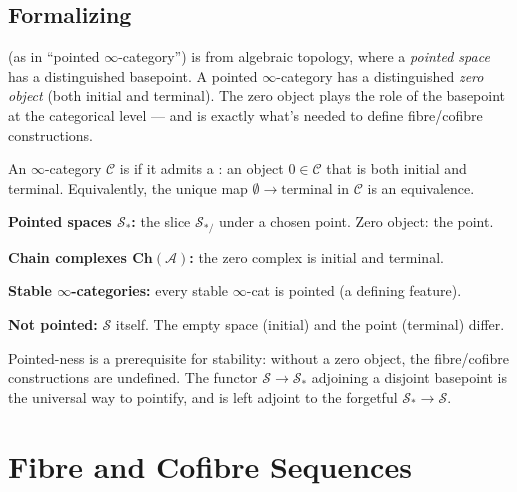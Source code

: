 \subsection{Formalizing}

\begin{nameorigin}
 (as in ``pointed $\infty$-category'') is from algebraic
topology, where a \emph{pointed space} has a distinguished basepoint.
A pointed $\infty$-category has a distinguished \emph{zero object}
(both initial and terminal). The zero object plays the role of the
basepoint at the categorical level — and is exactly what's needed to
define fibre/cofibre constructions.
\end{nameorigin}

\begin{definition}
\label{def:pointed-qcat}
An $\infty$-category $\mathcal{C}$ is  if it admits a
: an object $0 \in \mathcal{C}$ that is both initial
and terminal. Equivalently, the unique map $\emptyset \to \mathrm{terminal}$
in $\mathcal{C}$ is an equivalence.
\end{definition}

\begin{example_thm}
\label{ex:pointed-examples}
\textbf{Pointed spaces $\mathcal{S}_*$:} the slice $\mathcal{S}_{*/}$
under a chosen point. Zero object: the point.

\textbf{Chain complexes $\mathbf{Ch}(\mathcal{A})$:} the zero complex
is initial and terminal.

\textbf{Stable $\infty$-categories:} every stable $\infty$-cat is
pointed (a defining feature).

\textbf{Not pointed:} $\mathcal{S}$ itself. The empty space (initial)
and the point (terminal) differ.
\end{example_thm}

\begin{remark}
Pointed-ness is a prerequisite for stability: without a zero object, the
fibre/cofibre constructions are undefined. The functor $\mathcal{S} \to
\mathcal{S}_*$ adjoining a disjoint basepoint is the universal way to
pointify, and is left adjoint to the forgetful $\mathcal{S}_* \to \mathcal{S}$.
\end{remark}


\section{Fibre and Cofibre Sequences}
\label{sec:fibre-cofibre}

